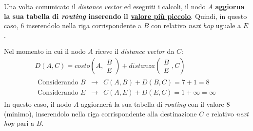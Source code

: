 \documentclass[a4paper]{article}
\begin{document}
	\noindent
	Una volta comunicato il \emph{distance vector} ed eseguiti i calcoli, il nodo $A$ \textbf{aggiorna la sua tabella di \emph{routing} inserendo il \underline{valore più piccolo}}. Quindi, in questo caso, $6$ inserendolo nella riga corrispondente a $B$ con relativo \emph{next hop} uguale a $E$.\newline
	
	\noindent
	Nel momento in cui il nodo $A$ riceve il \emph{distance vector} da $C$:
	\begin{gather*}
		D\left(A,C\right) = costo \left(A, \begin{matrix}
			B \\
			E
		\end{matrix}\right) + distanza \left(\begin{matrix}
			B \\
			E
		\end{matrix}, C\right)\\
		\begin{array}{lll}
			\text{Considerando } B & \longrightarrow & C\left(A,B\right) + D\left(B,C\right) = 7 + 1 = 8 \\
			\text{Considerando } E & \longrightarrow & C\left(A,E\right) + D\left(E,C\right) = 1 + \infty = \infty
		\end{array}
	\end{gather*}
	In questo caso, il nodo $A$ aggiornerà la sua tabella di \emph{routing} con il valore $8$ (minimo), inserendolo nella riga corrispondente alla destinazione $C$ e relativo \emph{next hop} pari a $B$.
\end{document}
